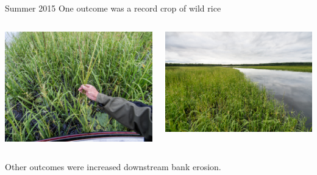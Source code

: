 \documentclass[compress,english]{beamer}
\begin{document}
\begin{frame}{Summer 2015}
One outcome was a record crop of wild rice
\begin{columns}
	\begin{column}{0.5\textwidth}
		\begin{center}
			\includegraphics[width=\textwidth]{20150804_194209.jpg}
		\end{center}
	\end{column}
	\begin{column}{0.5\textwidth}
		\begin{center}
			\includegraphics[width=\textwidth]{20150804_194303.jpg}
		\end{center}
	\end{column}
\end{columns}
Other outcomes were increased downstream bank erosion.
\end{frame}
\end{document}
